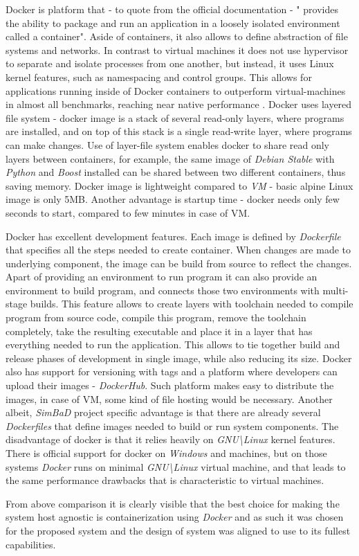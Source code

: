 Docker is platform that - to quote from the official documentation - " provides the ability to package and run an application in a loosely isolated environment called a container". Aside of containers, it also allows to define abstraction of file systems and networks.  In contrast to virtual machines it does not use hypervisor to separate and isolate processes from one another, but instead, it uses Linux kernel features, such as namespacing and control groups. This allows for applications running inside of Docker containers to outperform virtual-machines in almost all benchmarks, reaching near native performance \cite{Felter2015}. Docker uses layered file system - docker image is a stack of several read-only layers, where programs are installed, and on top of this stack is a single read-write layer, where programs can make changes. Use of layer-file system enables docker to share read only layers between containers, for example, the same image of \textit{Debian Stable} with \textit{Python} and \textit{Boost} installed can be shared between two different containers, thus saving memory. Docker image is lightweight compared to \textit{VM} - basic alpine Linux image is only 5MB. Another advantage is startup time - docker needs only few seconds to start, compared to few minutes in case of VM. 

Docker has excellent development features. Each image is defined by \textit{Dockerfile} that specifies all the steps needed to create container. When changes are made to underlying component, the image can be build from source to reflect the changes. Apart of providing an environment to run program it can also provide an environment to build program, and connects those two environments with multi-stage builds. This feature allows to create layers with toolchain needed to compile program from source code, compile this program, remove the toolchain completely, take the resulting executable and place it in a layer that has everything needed to run the application. This allows to tie together build and release phases of development in single image, while also reducing its size. Docker also has support for versioning with tags and a platform where developers can upload their images - \textit{DockerHub}. Such platform makes easy to distribute the images, in case of VM, some kind of file hosting would be necessary. Another albeit, \textit{SimBaD} project specific advantage is that there are already several \textit{Dockerfiles} that define images needed to build or run system components.
The disadvantage of docker is that it relies heavily on \textit{GNU\textbackslash Linux} kernel features. There is official support for docker on \textit{Windows} and  machines, but on those systems \textit{Docker} runs on minimal \textit{GNU\textbackslash Linux} virtual machine, and that leads to the same performance drawbacks that is characteristic to virtual machines. 

From above comparison it is clearly visible that the best choice for making the system host agnostic is containerization using \textit{Docker} and as such it was chosen for the proposed system and the design of system was aligned to use  to its fullest capabilities.

